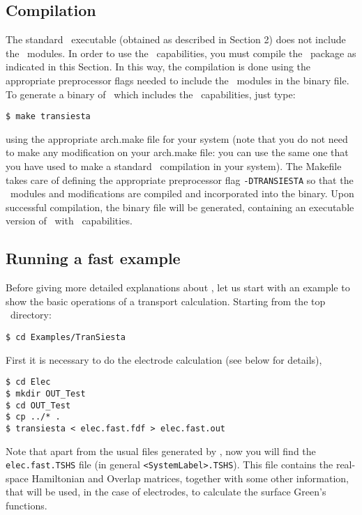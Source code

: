 \subsection{Compilation}

The standard \siesta\ executable (obtained as described in Section
2) does not include the \tsiesta\ modules. In order to use the
\tsiesta\ capabilities, you must compile the \siesta\
package as indicated in this Section. In this way, the compilation is
done using the appropriate preprocessor flags needed to include the
\tsiesta\ modules in the binary file. To generate a binary of
\siesta\ which includes the \tsiesta\ capabilities, just
type:

\begin{verbatim}
$ make transiesta
\end{verbatim}

using the appropriate arch.make file for your system (note that you do
not need to make any modification on your arch.make file: you can use
the same one that you have used to make a standard \siesta\
compilation in your system).  The Makefile takes care of defining the
appropriate preprocessor flag \texttt{-DTRANSIESTA} so that the \tsiesta\ 
modules and modifications are compiled and incorporated
into the binary. Upon successful compilation, the binary file 
\program{transiesta} will be generated, containing an executable version of
\siesta\ with \tsiesta\ capabilities.

\subsection{Running a fast example}

Before giving more detailed explanations about \tsiesta, let
us start with an example to show the basic operations of a transport
calculation.  Starting from the top \siesta\ directory:

\begin{verbatim}
$ cd Examples/TranSiesta
\end{verbatim}

First it is necessary to do the electrode calculation (see below for
details),

\begin{verbatim}
$ cd Elec
$ mkdir OUT_Test
$ cd OUT_Test
$ cp ../* .
$ transiesta < elec.fast.fdf > elec.fast.out
\end{verbatim}

Note that apart from the usual files generated by \siesta, now you will 
find the \texttt{elec.fast.TSHS} file (in general \texttt{<SystemLabel>.TSHS}). 
This file contains the real-space Hamiltonian and Overlap matrices, together 
with some other information, that will be used, in the case of electrodes, to 
calculate the surface Green's functions. 

